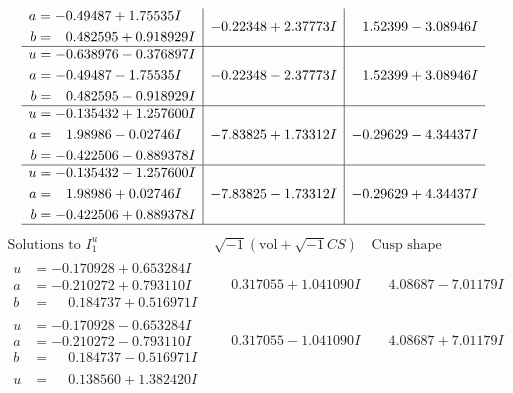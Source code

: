 \documentclass[1p]{elsarticle_modified}
\theoremstyle{definition}
\newcommand{\I}{\sqrt{-1}}
\begin{document}
$$\begin{array}{c|c|c}
\begin{aligned}
a &= -0.49487 + 1.75535 I \\
b &= \phantom{-}0.482595 + 0.918929 I\end{aligned}
 & -0.22348 + 2.37773 I & \phantom{-}1.52399 - 3.08946 I \\ \hline\begin{aligned}
u &= -0.638976 - 0.376897 I \\
a &= -0.49487 - 1.75535 I \\
b &= \phantom{-}0.482595 - 0.918929 I\end{aligned}
 & -0.22348 - 2.37773 I & \phantom{-}1.52399 + 3.08946 I \\ \hline\begin{aligned}
u &= -0.135432 + 1.257600 I \\
a &= \phantom{-}1.98986 - 0.02746 I \\
b &= -0.422506 - 0.889378 I\end{aligned}
 & -7.83825 + 1.73312 I & -0.29629 - 4.34437 I \\ \hline\begin{aligned}
u &= -0.135432 - 1.257600 I \\
a &= \phantom{-}1.98986 + 0.02746 I \\
b &= -0.422506 + 0.889378 I\end{aligned}
 & -7.83825 - 1.73312 I & -0.29629 + 4.34437 I\\
 \hline 
 \end{array}$$\newpage$$\begin{array}{c|c|c}  
\text{Solutions to }I^u_{1}& \I (\text{vol} + \sqrt{-1}CS) & \text{Cusp shape}\\
 \hline 
\begin{aligned}
u &= -0.170928 + 0.653284 I \\
a &= -0.210272 + 0.793110 I \\
b &= \phantom{-}0.184737 + 0.516971 I\end{aligned}
 & \phantom{-}0.317055 + 1.041090 I & \phantom{-}4.08687 - 7.01179 I \\ \hline\begin{aligned}
u &= -0.170928 - 0.653284 I \\
a &= -0.210272 - 0.793110 I \\
b &= \phantom{-}0.184737 - 0.516971 I\end{aligned}
 & \phantom{-}0.317055 - 1.041090 I & \phantom{-}4.08687 + 7.01179 I \\ \hline\begin{aligned}
u &= \phantom{-}0.138560 + 1.382420 I \\

\end{aligned}
\end{array}$$
\end{document}
